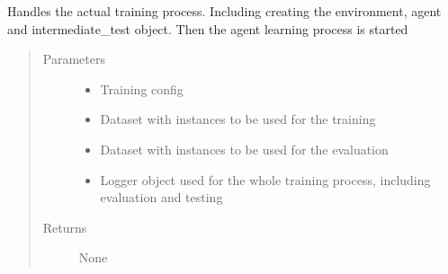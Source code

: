 \documentclass[letterpaper,10pt,english]{sphinxmanual}
\begin{document}

\begin{fulllineitems}
\label{\detokenize{agents.reinforcement_learning:agents.train.training}}
\sphinxAtStartPar
Handles the actual training process.
Including creating the environment, agent and intermediate\_test object. Then the agent learning process is started
\begin{quote}\begin{description}
\item[{Parameters}] \leavevmode\begin{itemize}
\item {} 
\sphinxAtStartPar
{} \textendash{} Training config

\item {} 
\sphinxAtStartPar
{} \textendash{} Dataset with instances to be used for the training

\item {} 
\sphinxAtStartPar
{} \textendash{} Dataset with instances to be used for the evaluation

\item {} 
\sphinxAtStartPar
{} \textendash{} Logger object used for the whole training process, including evaluation and testing

\end{itemize}

\item[{Returns}] \leavevmode
\sphinxAtStartPar
None

\end{description}\end{quote}

\end{fulllineitems}
\end{document}
